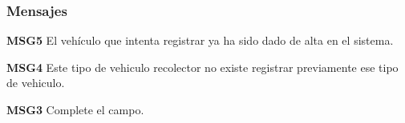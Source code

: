 \subsubsection{Mensajes}
	\begin{Citemize}
		\item {\bf MSG5} El vehículo que intenta registrar ya ha sido dado de alta en el sistema.
		\item {\bf MSG4} Este tipo de vehiculo recolector no existe registrar previamente ese tipo de vehiculo.
		\item {\bf MSG3} Complete el campo.
	\end{Citemize}